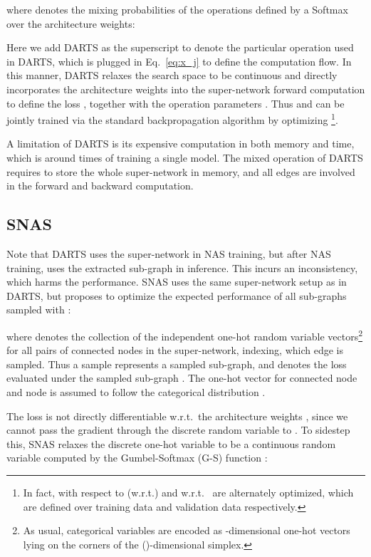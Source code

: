 \documentclass{article}
\newcommand{\neqref}{Eq.~\eqref}
\begin{document}
where  denotes the mixing probabilities of the  operations defined by a Softmax over the architecture weights:

Here we add DARTS as the superscript to denote the particular operation  used in DARTS, which is plugged in \neqref{eq:x_j} to define the computation flow.
In this manner, DARTS relaxes the search space to be continuous and directly incorporates the architecture weights  into the super-network forward computation to define the loss , together with the operation parameters . Thus  and  can be jointly trained via the standard backpropagation algorithm by optimizing \footnote{In fact,  with respect to (w.r.t.)  and  w.r.t.~ are alternately optimized, which are defined over training data and validation data respectively.}.

A limitation of DARTS is its expensive computation in both memory and time, which is around  times of training a single model.
The mixed operation of DARTS requires to store the whole super-network in memory, and all edges are involved in the forward and backward computation.
\vspace{-2mm}

\subsection{SNAS}
\label{sec:relatedwork:SNAS}

Note that DARTS uses the super-network in NAS training, but after NAS training, uses the extracted sub-graph in inference. This incurs an inconsistency, which harms the performance.
SNAS uses the same super-network setup as in DARTS, but proposes to optimize the expected performance of all sub-graphs sampled with :

where  denotes the collection of the independent one-hot random variable vectors\footnote{As usual, categorical variables are encoded as -dimensional one-hot vectors lying on the corners of the ()-dimensional simplex.} for all pairs of connected nodes in the super-network, indexing, which edge is sampled. Thus a sample  represents a sampled sub-graph, and  denotes the loss evaluated under the sampled sub-graph .
The one-hot vector  for connected node and node is assumed to follow the categorical distribution .

The loss  is not directly differentiable w.r.t.~the architecture weights , since we cannot pass the gradient through the discrete random variable  to .
To sidestep this, SNAS relaxes the discrete one-hot variable  to be a continuous random variable computed by the Gumbel-Softmax (G-S) function \cite{Jang2016Categorical}:
\end{document}
